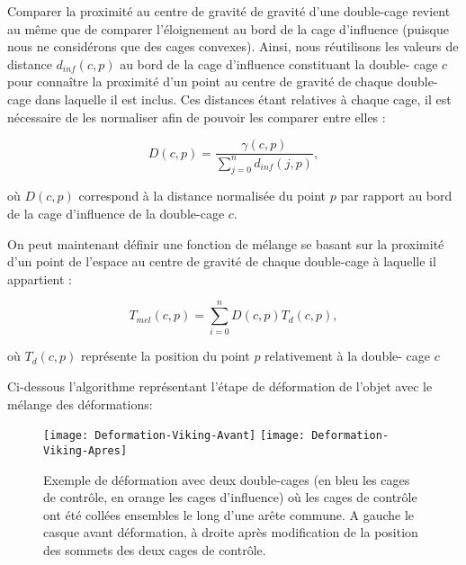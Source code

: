 Comparer la proximité au centre de gravité de gravité d'une double-cage
revient au même que de comparer l'éloignement au bord de la cage d'influence
(puisque nous ne considérons que des cages convexes). Ainsi, nous réutilisons
les valeurs de distance $d_{inf}(c, p)$ au bord de la cage d'influence
constituant la double- cage $c$ pour connaître la proximité d'un point au
centre de gravité de chaque double-cage dans laquelle il est inclus. Ces
distances étant relatives à chaque cage, il est nécessaire de les normaliser
afin de pouvoir les comparer entre elles :

\begin{displaymath}
  D(c, p) = \frac{\gamma(c, p)}{\sum_{j=0}^n d_{inf}(j, p)}, 
\end{displaymath}

où $D(c, p)$ correspond à la distance normalisée du point $p$ par rapport au
bord de la cage d'influence de la double-cage $c$.

On peut maintenant définir une fonction de mélange se basant sur la proximité
d'un point de l'espace au centre de gravité de chaque double-cage à laquelle
il appartient :

\begin{displaymath}
  T_{mel}(c, p) = \sum_{i=0}^n D(c, p) T_{d}(c, p),
\end{displaymath}

où $T_{d}(c, p)$ représente la position du point $p$ relativement à la double-
cage $c$

Ci-dessous l'algorithme représentant l'étape de déformation de l'objet avec le
mélange des déformations: \\


\begin{figure}[!ht]
    \texttt{[image: Deformation-Viking-Avant]}
    \texttt{[image: Deformation-Viking-Apres]}

    \caption[Exemple de déformation double-cages] {Exemple de déformation avec
deux double-cages (en bleu les cages de contrôle, en orange les cages
d'influence) où les cages de contrôle ont été collées ensembles le long d'une
arête commune. A gauche le casque avant déformation, à droite après
modification de la position des sommets des deux cages de contrôle.}

\end{figure}